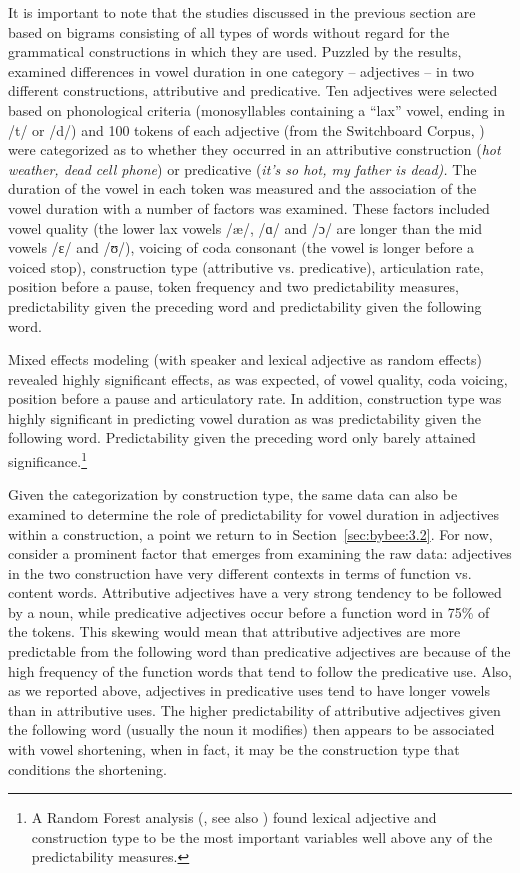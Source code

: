 \documentclass[output=paper]{langscibook}
\begin{document}
It is important to note that the studies discussed in the previous section are based on bigrams consisting of all types of words without regard for the grammatical constructions in which they are used. Puzzled by the results,  \citet{BybeeSouza2019} examined differences in vowel duration in one category -- adjectives -- in two different constructions, attributive and predicative. Ten adjectives were selected based on phonological criteria (monosyllables containing a ``lax'' vowel, ending in /t/ or /d/) and 100 tokens of each adjective (from the Switchboard Corpus, \citealt{GodfreyHolliman1993}) were categorized as to whether they occurred in an attributive construction (\textit{hot weather, dead cell phone}) or predicative (\textit{it’s so hot, my father is dead).} The duration of the vowel in each token was measured and the association of the vowel duration with a number of factors was examined. These factors included vowel quality (the lower lax vowels /æ/, /ɑ/ and /ɔ/ are longer than the mid vowels /ɛ/ and /ʊ/), voicing of coda consonant (the vowel is longer before a voiced stop), construction type (attributive vs. predicative), articulation rate, position before a pause, token frequency and two predictability measures, predictability given the preceding word and predictability given the following word. 

Mixed effects modeling (with speaker and lexical adjective as random effects) revealed highly significant effects, as was expected, of vowel quality, coda voicing, position before a pause and articulatory rate. In addition, construction type was highly significant in predicting vowel duration as was predictability given the following word. Predictability given the preceding word only barely attained significance.\footnote{A Random Forest analysis (\citealt{MatsukiEtAl2016}, see also \citealt{TagliamonteBaayen2012}) found lexical adjective and construction type to be the most important variables well above any of the predictability measures.} 

Given the categorization by construction type, the same data can also be examined to determine the role of predictability for vowel duration in adjectives within a construction, a point we return to in Section~\ref{sec:bybee:3.2}. For now, consider a prominent factor that emerges from examining the raw data: adjectives in the two construction have very different contexts in terms of function vs. content words. Attributive adjectives have a very strong tendency to be followed by a noun, while predicative adjectives occur before a function word in 75\% of the tokens. This skewing would mean that attributive adjectives are more predictable from the following word than predicative adjectives are because of the high frequency of the function words that tend to follow the predicative use. Also, as we reported above, adjectives in predicative uses tend to have longer vowels than in attributive uses. The higher predictability of attributive adjectives given the following word (usually the noun it modifies) then appears to be associated with vowel shortening, when in fact, it may be the construction type that conditions the shortening. 
\end{document}
